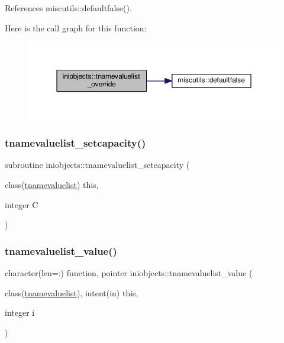 References miscutils\+::defaultfalse().

Here is the call graph for this function\+:
\nopagebreak
\begin{figure}[H]
\begin{center}
\leavevmode
\includegraphics[width=350pt]{namespaceiniobjects_a96ec4d817cb41567afeefde7d8c0c7ec_cgraph}
\end{center}
\end{figure}
\mbox{\label{namespaceiniobjects_a42d39e0fcf188dab68646beac2c1fa50}} 
\subsubsection{\texorpdfstring{tnamevaluelist\+\_\+setcapacity()}{tnamevaluelist\_setcapacity()}}
{\footnotesize\ttfamily subroutine iniobjects\+::tnamevaluelist\+\_\+setcapacity (\begin{DoxyParamCaption}\item[{class(\mbox{\hyperlink{structiniobjects_1_1tnamevaluelist}{tnamevaluelist}})}]{this,  }\item[{integer}]{C }\end{DoxyParamCaption})\hspace{0.3cm}{\ttfamily [private]}}

\mbox{\label{namespaceiniobjects_a61f8d01755e0bc000c0c8ca3eba8e43a}} 
\subsubsection{\texorpdfstring{tnamevaluelist\+\_\+value()}{tnamevaluelist\_value()}}
{\footnotesize\ttfamily character(len=\+:) function, pointer iniobjects\+::tnamevaluelist\+\_\+value (\begin{DoxyParamCaption}\item[{class(\mbox{\hyperlink{structiniobjects_1_1tnamevaluelist}{tnamevaluelist}}), intent(in)}]{this,  }\item[{integer}]{i }\end{DoxyParamCaption})\hspace{0.3cm}{\ttfamily [private]}}

